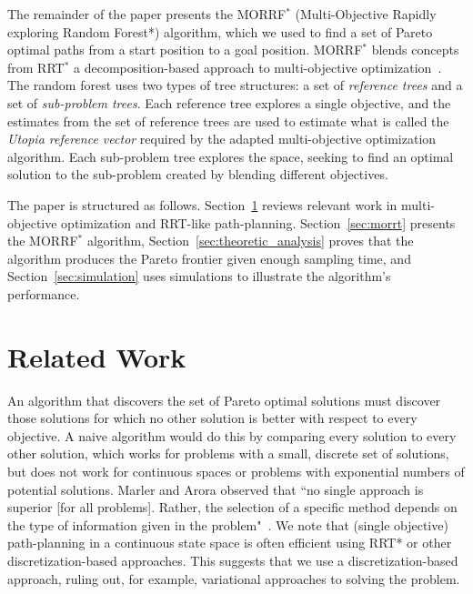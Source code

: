 \documentclass{article}
\begin{document}
The remainder of the paper presents the MORRF$^{*}$ (Multi-Objective Rapidly exploring Random Forest*) algorithm, which we used to find a set of Pareto optimal paths from a start position to a goal position.  
MORRF$^{*}$ blends concepts from RRT$^{*}$ a decomposition-based approach to multi-objective optimization~\cite{4358754}.  
The random forest uses two types of tree structures: a set of {\em reference trees} and a set of {\em sub-problem trees}.  
Each reference tree explores a single objective, and the estimates from the set of reference trees are used to estimate what is called the {\em Utopia reference vector} required by the adapted multi-objective optimization algorithm.  
Each sub-problem tree explores the space, seeking to find an optimal solution to the sub-problem created by blending different objectives. 

The paper is structured as follows.  
Section~\ref{sec:related_works} reviews relevant work in multi-objective optimization and RRT-like path-planning. 
Section~\ref{sec:morrt} presents the MORRF$^{*}$ algorithm,  
Section~\ref{sec:theoretic_analysis} proves that the algorithm produces the Pareto frontier given enough sampling time, 
and Section~\ref{sec:simulation} uses simulations to illustrate the algorithm's performance.

\section{Related Work}
\label{sec:related_works}

An algorithm that discovers the set of Pareto optimal solutions must discover those solutions for which no other solution is better with respect to every objective.  A naive algorithm would do this by comparing every solution to every other solution, which works for problems with a small, discrete set of solutions, but does not work for continuous spaces or problems with exponential numbers of potential solutions.  
Marler and Arora observed that ``no single approach is superior [for all problems].  
Rather, the selection of a specific method depends on the type of information given in the problem"~\cite{marler2004survey}.  
We note that (single objective) path-planning in a continuous state space is often efficient using RRT* or other discretization-based approaches. This suggests that we use a discretization-based approach, ruling out, for example, variational approaches to solving the problem.    
\end{document}
